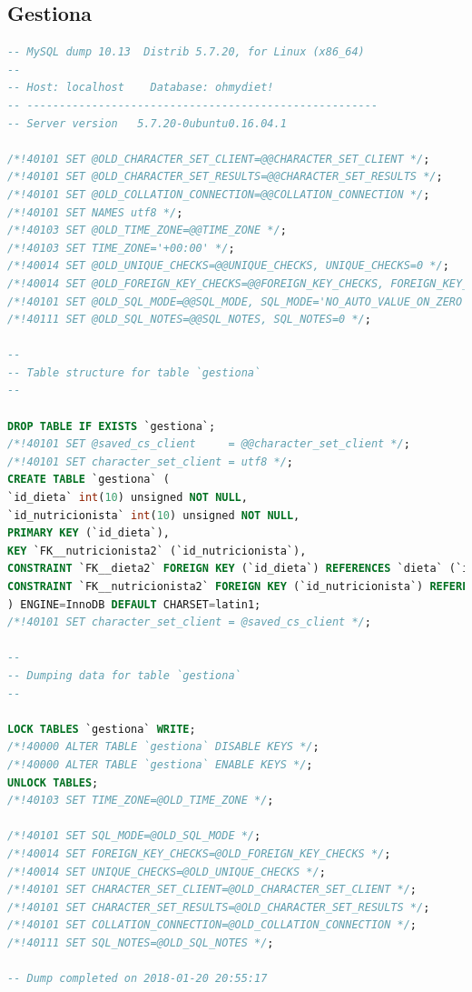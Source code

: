 \documentclass[12pt,letterpaper]{article}
\begin{document}
\subsection{Gestiona}
\begin{lstlisting}[language=sql]
-- MySQL dump 10.13  Distrib 5.7.20, for Linux (x86_64)
--
-- Host: localhost    Database: ohmydiet!
-- ------------------------------------------------------
-- Server version	5.7.20-0ubuntu0.16.04.1

/*!40101 SET @OLD_CHARACTER_SET_CLIENT=@@CHARACTER_SET_CLIENT */;
/*!40101 SET @OLD_CHARACTER_SET_RESULTS=@@CHARACTER_SET_RESULTS */;
/*!40101 SET @OLD_COLLATION_CONNECTION=@@COLLATION_CONNECTION */;
/*!40101 SET NAMES utf8 */;
/*!40103 SET @OLD_TIME_ZONE=@@TIME_ZONE */;
/*!40103 SET TIME_ZONE='+00:00' */;
/*!40014 SET @OLD_UNIQUE_CHECKS=@@UNIQUE_CHECKS, UNIQUE_CHECKS=0 */;
/*!40014 SET @OLD_FOREIGN_KEY_CHECKS=@@FOREIGN_KEY_CHECKS, FOREIGN_KEY_CHECKS=0 */;
/*!40101 SET @OLD_SQL_MODE=@@SQL_MODE, SQL_MODE='NO_AUTO_VALUE_ON_ZERO' */;
/*!40111 SET @OLD_SQL_NOTES=@@SQL_NOTES, SQL_NOTES=0 */;

--
-- Table structure for table `gestiona`
--

DROP TABLE IF EXISTS `gestiona`;
/*!40101 SET @saved_cs_client     = @@character_set_client */;
/*!40101 SET character_set_client = utf8 */;
CREATE TABLE `gestiona` (
`id_dieta` int(10) unsigned NOT NULL,
`id_nutricionista` int(10) unsigned NOT NULL,
PRIMARY KEY (`id_dieta`),
KEY `FK__nutricionista2` (`id_nutricionista`),
CONSTRAINT `FK__dieta2` FOREIGN KEY (`id_dieta`) REFERENCES `dieta` (`id_dieta`),
CONSTRAINT `FK__nutricionista2` FOREIGN KEY (`id_nutricionista`) REFERENCES `nutricionista` (`id_nutricionista`)
) ENGINE=InnoDB DEFAULT CHARSET=latin1;
/*!40101 SET character_set_client = @saved_cs_client */;

--
-- Dumping data for table `gestiona`
--

LOCK TABLES `gestiona` WRITE;
/*!40000 ALTER TABLE `gestiona` DISABLE KEYS */;
/*!40000 ALTER TABLE `gestiona` ENABLE KEYS */;
UNLOCK TABLES;
/*!40103 SET TIME_ZONE=@OLD_TIME_ZONE */;

/*!40101 SET SQL_MODE=@OLD_SQL_MODE */;
/*!40014 SET FOREIGN_KEY_CHECKS=@OLD_FOREIGN_KEY_CHECKS */;
/*!40014 SET UNIQUE_CHECKS=@OLD_UNIQUE_CHECKS */;
/*!40101 SET CHARACTER_SET_CLIENT=@OLD_CHARACTER_SET_CLIENT */;
/*!40101 SET CHARACTER_SET_RESULTS=@OLD_CHARACTER_SET_RESULTS */;
/*!40101 SET COLLATION_CONNECTION=@OLD_COLLATION_CONNECTION */;
/*!40111 SET SQL_NOTES=@OLD_SQL_NOTES */;

-- Dump completed on 2018-01-20 20:55:17

\end{lstlisting}
\end{document}
